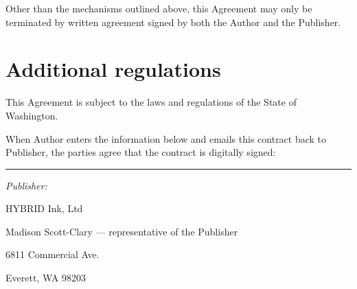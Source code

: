 \documentclass[12pt,letterpaper,oneside]{article}
\def\lbl#1{\hbox to 4cm{#1\dotfill\strut}}%
\def\labelline#1#2{\lbl{#1}\vbox{\hbox{\TextField[name=#1,width=#2]{\null}}\kern2pt\hrule}}
\def\q#1{\hbox to \hsize{\labelline{#1}{\longline}}\vskip1.4ex}
\begin{document}
Other than the mechanisms outlined above, this Agreement may only be terminated by written agreement signed by both the Author and the Publisher.

\section{Additional regulations}

This Agreement is subject to the laws and regulations of the State of Washington.

\newpage

When Author enters the information below and emails this contract back to Publisher, the parties agree that the contract is digitally signed:


\hrule

\vspace{12pt}

\noindent \textit{Publisher:}

{\HybridFamily HYBRID Ink, Ltd}

Madison Scott-Clary --- representative of the Publisher

6811 Commercial Ave.

Everett, WA 98203
\end{document}
